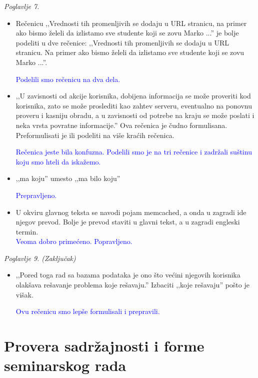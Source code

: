 \documentclass[a4paper]{report}
\newcommand{\odgovor}[1]{\textcolor{blue}{#1}}
\begin{document}
\textit{Poglavlje 7.}
\begin{itemize}
\item Rečenicu ,,Vrednosti tih promenljivih se dodaju u URL stranicu, na primer ako bismo želeli da izlistamo sve studente koji se zovu Marko ...'' je bolje podeliti u dve rečenice: ,,Vrednosti tih promenljivih se dodaju u URL stranicu. Na primer ako bismo želeli da izlistamo sve studente koji se zovu Marko ...''.

\odgovor{Podelili smo rečenicu na dva dela.}

\item ,,U zavisnosti od akcije korisnika, dobijena informacija se može proveriti kod korisnika,
zato se može proslediti kao zahtev serveru, eventualno na ponovnu proveru i kasniju obradu, a u zavisnosti od potrebe na kraju se može poslati i neka vrsta povratne informacije.'' Ova rečenica je čudno formulisana. Preformulisati je ili podeliti na više kraćih rečenica.

\odgovor{Rečenica jeste bila konfuzna. Podelili smo je na tri rečenice i zadržali suštinu koju smo hteli da iskažemo.}

\item ,,ma koju'' umesto ,,ma bilo koju''

\odgovor{Prepravljeno.}

\item U okviru glavnog teksta se navodi pojam memcached, a onda u zagradi ide njegov prevod. Bolje je prevod staviti u glavni tekst, a u zagradi engleski termin.\\
\odgovor{Veoma dobro primećeno. Popravljeno.}

\end{itemize}

\textit{Poglavlje 9. (Zaključak)}
\begin{itemize}
\item ,,Pored toga rad sa bazama podataka je ono što većini njegovih korisnika olakšava rešavanje problema koje rešavaju.'' Izbaciti ,,koje rešavaju'' pošto je višak.

\odgovor{Ovu rečenicu smo lepše formulisali i prepravili.}

\end{itemize}

\section{Provera sadržajnosti i forme seminarskog rada}
\end{document}
